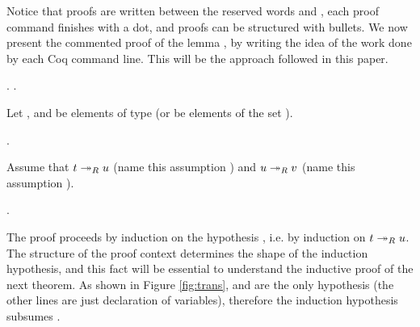 \noindent Notice that proofs are written between
the reserved words  and , each proof command finishes with
a dot, and proofs can be structured with bullets. We now present the 
commented proof of the lemma , by writing the 
idea of the work done by each Coq command line. This will be the 
approach followed in this paper. \begin{coqdoccode}
\coqdocemptyline
\coqdocnoindent
{}.\coqdoceol
\coqdocindent{1.00em}
   . \end{coqdoccode}
Let , and  be elements of type 
      (or be elements of the set ).\begin{coqdoccode}
\coqdocemptyline
\coqdocindent{1.00em}
  . \end{coqdoccode}
Assume that $t \twoheadrightarrow_R u$
      (name this assumption ) and $u\twoheadrightarrow_R v$ (name this assumption
      ). \begin{coqdoccode}
\coqdocemptyline
\coqdocindent{1.00em}
 . \end{coqdoccode}
The proof proceeds by induction on the hypothesis
      , i.e. by induction on $t \twoheadrightarrow_R u$. The structure of the
      proof context determines the shape of the induction hypothesis,
      and this fact will be essential to understand the inductive
      proof of the next theorem. As shown in Figure \ref{fig:trans},
       and  are the only hypothesis (the other lines are just
      declaration of variables), therefore the induction hypothesis
      subsumes .


